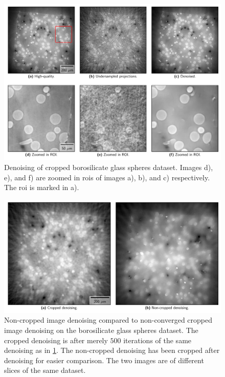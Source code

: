 \begin{figure}[htbp]
  \centering
  \includegraphics[width=.9\textwidth]{figures/croppeddenoising.pdf}
  \caption[Cropped image denoising on the borosilicate glass spheres dataset]{Denoising of cropped borosilicate glass spheres dataset. Images d), e), and f) are zoomed in \gls{roi}s of images a), b), and c) respectively. The \gls{roi} is marked in a). }
  \label{fig:croppeddenoising}
\end{figure}

\begin{figure}[htbp]
  \centering
  \includegraphics[width=.9\textwidth]{figures/croppednoncroppedearly.pdf}
  \caption[Non-cropped image denoising compared to non-converged cropped image denoising on the borosilicate glass spheres dataset]{Non-cropped image denoising compared to non-converged cropped image denoising on the borosilicate glass spheres dataset. The cropped denoising is after merely $500$ iterations of the same denoising as in \cref{fig:croppeddenoising}. The non-cropped denoising has been cropped after denoising for easier comparison. The two images are of different slices of the same dataset. }
  \label{fig:croppednoncroppedearly}
\end{figure}

